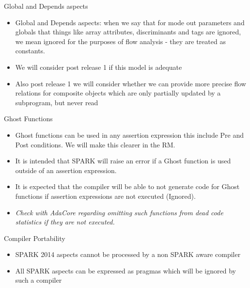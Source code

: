 \documentclass{beamer}
\begin{document}
\begin{frame}{Global and Depends aspects}

  \begin{itemize}

  \item Global and Depends aspects: when we say that for mode out
    parameters and globals that things like array attributes,
    discriminants and tags are ignored, we mean ignored for the
    purposes of  flow analysis - they are treated as constants.  
  \item We will consider post release 1 if this model is adequate
  \item Also post release 1 we will consider whether we can provide more
  precise flow relations for composite objects which are only
  partially updated by a subprogram, but never read
  \end{itemize}

\end{frame}

\begin{frame}{Ghost Functions}

  \begin{itemize}

  \item Ghost functions can be used in any assertion expression this
    include Pre and Post conditions.  We will make this clearer in the
    RM.
  \item It is intended that SPARK will raise an error if a Ghost
    function is used outside of an assertion expression.  
  \item It is expected that the compiler will be able to not generate
    code for Ghost functions if assertion expressions are not executed
    (Ignored).
  \item \emph {Check with AdaCore regarding omitting such functions
    from dead code statistics if they are not executed.}
 \end{itemize}

\end{frame}

\begin{frame}{Compiler Portability}

  \begin{itemize}

  \item SPARK 2014 aspects cannot be processed by a non SPARK aware compiler  
  \item All SPARK aspects can be expressed as pragmas which will be
    ignored by such a compiler
 \end{itemize}

\end{frame}
\end{document}
